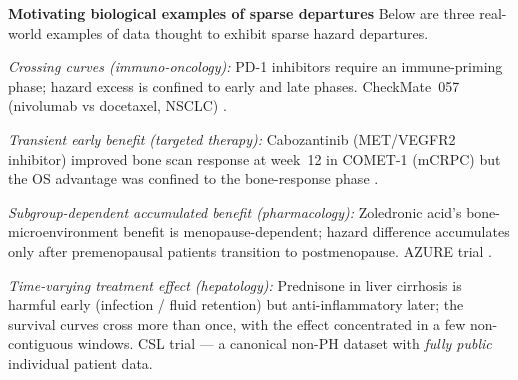 \documentclass[unnumsec,webpdf,contemporary,large]{oup-authoring-template}
\let\origitemize\itemize
\let\origenditemize\enditemize
\renewenvironment{itemize}{%
  \origitemize
  \setlength{\itemsep}{1pt}%
  \setlength{\parskip}{0pt}%
  \setlength{\topsep}{3pt}%
}{\origenditemize}
\begin{document}
\textbf{Motivating biological examples of sparse departures}
Below are three real-world examples of data thought to exhibit sparse hazard departures.
\begin{itemize}
  \item \textit{Crossing curves (immuno-oncology):} PD-1 inhibitors
        require an immune-priming phase; hazard excess is confined to
        early and late phases. CheckMate~057 (nivolumab vs docetaxel,
        NSCLC) \citep{borghaei2015}.
  \item \textit{Transient early benefit (targeted therapy):} Cabozantinib
        (MET/VEGFR2 inhibitor) improved bone scan response at week~12 in
        COMET-1 (mCRPC) but the OS advantage was confined to the
        bone-response phase \citep{smith2016}.
  \item \textit{Subgroup-dependent accumulated benefit (pharmacology):}
        Zoledronic acid's bone-microenvironment benefit is
        menopause-dependent; hazard difference accumulates only after
        premenopausal patients transition to postmenopause.
        AZURE trial \citep{coleman2011}.
  \item \textit{Time-varying treatment effect (hepatology):} Prednisone
        in liver cirrhosis is harmful early (infection / fluid retention)
        but anti-inflammatory later; the survival curves cross more than
        once, with the effect concentrated in a few non-contiguous windows.
        CSL trial \citep{csl_data} --- a canonical non-PH dataset with
        \emph{fully public} individual patient data.
\end{itemize}

\end{document}

